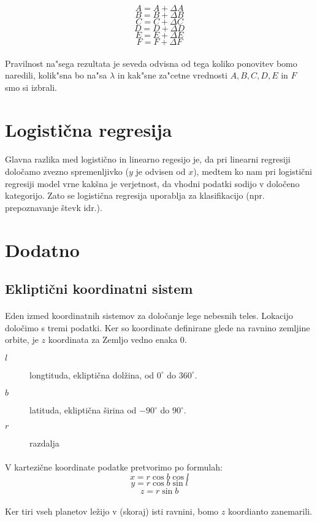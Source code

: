 \documentclass[a4paper, 12pt]{article}
\begin{document}
	$$A = A + \Delta A$$
	$$B = B + \Delta B$$
	$$C = C + \Delta C$$
	$$D = D + \Delta D$$
	$$E = E + \Delta E$$
	$$F = F + \Delta F$$

	\paragraph{}Pravilnost na"sega rezultata je seveda odvisna od tega koliko ponovitev bomo naredili, kolik"sna bo na"sa $\lambda$ in kak"sne za"cetne vrednosti $A, B, C, D, E$ in $F$ smo si izbrali.

	\section*{Logistična regresija}
	\paragraph{}
	Glavna razlika med logistično in linearno regesijo je, da pri linearni regresiji določamo zvezno spremenljivko ($y$ je odvisen od $x$), medtem ko nam pri logistični regresiji model vrne kakšna je verjetnost, da vhodni podatki sodijo v določeno kategorijo.
	Zato se logistična regresija uporablja za klasifikacijo (npr. prepoznavanje števk idr.).


	\section*{Dodatno}
	\subsection*{Ekliptični koordinatni sistem}
	\paragraph{}
	Eden izmed koordinatnih sistemov za določanje lege nebesnih teles. Lokacijo določimo s tremi podatki. Ker so koordinate definirane glede na ravnino zemljine orbite, je $z$ koordinata za Zemljo vedno enaka 0.
	\begin{description}
		\item[$l$] longtituda, ekliptična dolžina, od $0^\circ$ do $360^\circ$.
		\item[$b$] latituda, ekliptična širina od $-90^\circ$ do $90^\circ$.
		\item[$r$] razdalja
	\end{description}

	\paragraph{}
	V kartezične koordinate podatke pretvorimo po formulah:
	$$x = r \cos b \cos l$$
	$$y = r \cos b \sin l$$
	$$z = r \sin b$$

	\paragraph{}
	Ker tiri vseh planetov ležijo v (skoraj) isti ravnini, bomo $z$ koordianto zanemarili.
\end{document}
